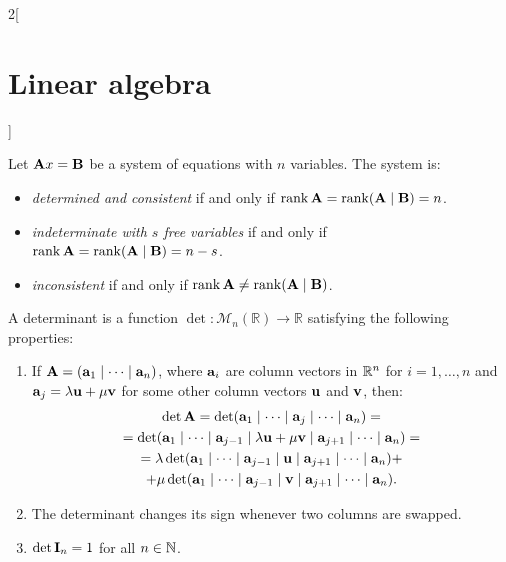 \documentclass[../../../main.tex]{subfiles}
\begin{document}
\begin{multicols}{2}[\section{Linear algebra}]
\begin{theorem}
    Let $\vb{A}x=\vb{B}$ be a system of equations with $n$ variables. The system is:
    \begin{itemize}
        \item \textit{determined and consistent} if and only if $\rank \vb{A}=\rank (\vb{A}\mid \vb{B})=n$.
        \item \textit{indeterminate with $s$ free variables} if and only if $\rank \vb{A}=\rank (\vb{A}\mid \vb{B})=n-s$.
        \item \textit{inconsistent} if and only if $\rank \vb{A}\ne\rank (\vb{A}\mid \vb{B})$.
    \end{itemize}
\end{theorem}
\begin{definition}[Determinant]
    A determinant is a function $\det:\mathcal{M}_n(\mathbb{R})\rightarrow\mathbb{R}$ satisfying the following properties:
    \begin{enumerate}
        \item If $\vb{A}=(\vb{a}_1\mid\cdots\mid \vb{a}_n)$, where $\vb{a}_i$ are column vectors in $\mathbb{R}^n$ for $i=1,\ldots,n$ and $\vb{a}_j=\lambda\vb{u}+\mu\vb{v}$ for some other column vectors $\vb{u}$ and $\vb{v}$, then:
        \begin{multline*}
            \det \vb{A}=\det(\vb{a}_1\mid\cdots\mid\vb{a}_j\mid\cdots\mid \vb{a}_n)=\\=\det(\vb{a}_1\mid\cdots\mid \vb{a}_{j-1}\mid\lambda \vb{u}+\mu \vb{v}\mid \vb{a}_{j+1}\mid\cdots\mid \vb{a}_n)=\\=\lambda\det(\vb{a}_1\mid\cdots\mid \vb{a}_{j-1}\mid \vb{u}\mid \vb{a}_{j+1}\mid\cdots\mid \vb{a}_n)+\\+\mu\det(\vb{a}_1\mid\cdots\mid \vb{a}_{j-1}\mid \vb{v}\mid \vb{a}_{j+1}\mid\cdots\mid \vb{a}_n).
        \end{multline*}
        \item The determinant changes its sign whenever two columns are swapped.
        \item $\det \vb{I}_n=1$ for all $n\in\mathbb{N}$.
    \end{enumerate}
\end{definition}
\begin{lemma}

\end{lemma}
\end{multicols}
\end{document}
